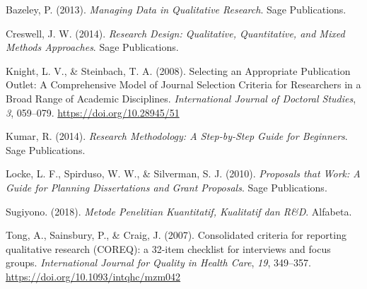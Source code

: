 \documentclass[
  indonesian,
  letterpaper,
]{scrbook}
\newlength{\cslhangindent}
\newenvironment{CSLReferences}[2] %
 {\begin{list}{}{%
  \setlength{\itemindent}{0pt}
  \setlength{\leftmargin}{0pt}
  \setlength{\parsep}{0pt}
  \ifodd #1
   \setlength{\leftmargin}{\cslhangindent}
   \setlength{\itemindent}{-1\cslhangindent}
  \fi
  \setlength{\itemsep}{#2\baselineskip}}}
 {\end{list}}
\begin{document}
\label{refs}
\begin{CSLReferences}{1}{0}
Bazeley, P. (2013). \emph{Managing Data in Qualitative Research}. Sage
Publications.

Creswell, J. W. (2014). \emph{Research Design: Qualitative,
Quantitative, and Mixed Methods Approaches}. Sage Publications.

Knight, L. V., \& Steinbach, T. A. (2008). Selecting an Appropriate
Publication Outlet: A Comprehensive Model of Journal Selection Criteria
for Researchers in a Broad Range of Academic Disciplines.
\emph{International Journal of Doctoral Studies}, \emph{3}, 059--079.
\url{https://doi.org/10.28945/51}

Kumar, R. (2014). \emph{Research Methodology: A Step-by-Step Guide for
Beginners}. Sage Publications.

Locke, L. F., Spirduso, W. W., \& Silverman, S. J. (2010).
\emph{Proposals that Work: A Guide for Planning Dissertations and Grant
Proposals}. Sage Publications.

Sugiyono. (2018). \emph{Metode Penelitian Kuantitatif, Kualitatif dan
R\&D}. Alfabeta.

Tong, A., Sainsbury, P., \& Craig, J. (2007). Consolidated criteria for
reporting qualitative research (COREQ): a 32-item checklist for
interviews and focus groups. \emph{International Journal for Quality in
Health Care}, \emph{19}, 349--357.
\url{https://doi.org/10.1093/intqhc/mzm042}

\end{CSLReferences}


\backmatter
\end{document}
